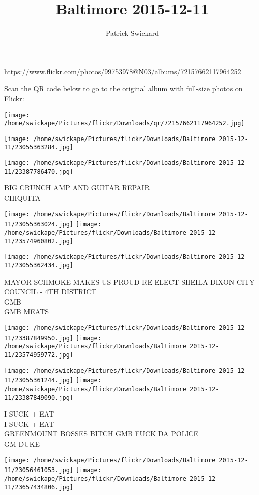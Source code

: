 \documentclass[10pt,letterpaper]{article}
\title{Baltimore 2015-12-11}
\author{Patrick Swickard}
\date{}
\begin{document}
\maketitle

\url{https://www.flickr.com/photos/99753978@N03/albums/72157662117964252}

Scan the QR code below to go to the original album with full-size photos on Flickr:

\texttt{[image: /home/swickape/Pictures/flickr/Downloads/qr/72157662117964252.jpg]}
\pagebreak

\texttt{[image: /home/swickape/Pictures/flickr/Downloads/Baltimore 2015-12-11/23055363284.jpg]}

\vspace{0.25in}
\texttt{[image: /home/swickape/Pictures/flickr/Downloads/Baltimore 2015-12-11/23387786470.jpg]}

BIG CRUNCH AMP AND GUITAR REPAIR\\
CHIQUITA
\pagebreak

\texttt{[image: /home/swickape/Pictures/flickr/Downloads/Baltimore 2015-12-11/23055363024.jpg]}
\texttt{[image: /home/swickape/Pictures/flickr/Downloads/Baltimore 2015-12-11/23574960802.jpg]}

\vspace{0.25in}
\texttt{[image: /home/swickape/Pictures/flickr/Downloads/Baltimore 2015-12-11/23055362434.jpg]}

MAYOR SCHMOKE MAKES US PROUD RE{-}ELECT SHEILA DIXON CITY COUNCIL {-} 4TH DISTRICT\\
GMB\\
GMB MEATS
\pagebreak

\texttt{[image: /home/swickape/Pictures/flickr/Downloads/Baltimore 2015-12-11/23387849950.jpg]}
\texttt{[image: /home/swickape/Pictures/flickr/Downloads/Baltimore 2015-12-11/23574959772.jpg]}

\texttt{[image: /home/swickape/Pictures/flickr/Downloads/Baltimore 2015-12-11/23055361244.jpg]}
\texttt{[image: /home/swickape/Pictures/flickr/Downloads/Baltimore 2015-12-11/23387849090.jpg]}

I SUCK + EAT\\
I SUCK + EAT\\
GREENMOUNT BOSSES BITCH GMB FUCK DA POLICE\\
GM DUKE
\pagebreak

\texttt{[image: /home/swickape/Pictures/flickr/Downloads/Baltimore 2015-12-11/23056461053.jpg]}
\texttt{[image: /home/swickape/Pictures/flickr/Downloads/Baltimore 2015-12-11/23657434806.jpg]}
\end{document}
